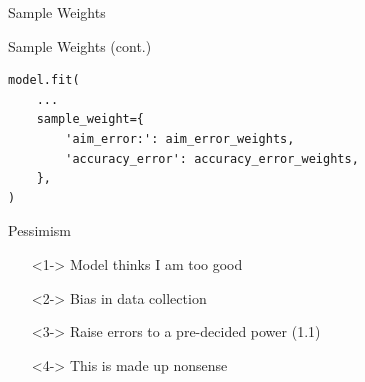 \documentclass[table]{beamer}
\begin{document}
\begin{frame}{Sample Weights}

\end{frame}

\begin{frame}[fragile]{Sample Weights (cont.)}
  \begin{verbatim}
model.fit(
    ...
    sample_weight={
        'aim_error:': aim_error_weights,
        'accuracy_error': accuracy_error_weights,
    },
)
  \end{verbatim}
\end{frame}

\begin{frame}{Pessimism}
  \begin{itemize}
  \item[]<1-> Model thinks I am too good
  \item[]<2-> Bias in data collection
  \item[]<3-> Raise errors to a pre-decided power (1.1)
  \item[]<4-> This is made up nonsense
  \end{itemize}
\end{frame}
\end{document}
